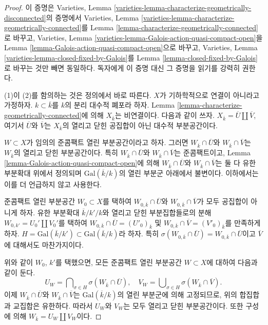 \begin{proof}
이 증명은 Varieties, Lemma
\ref{varieties-lemma-characterize-geometrically-disconnected}의 증명에서
Varieties, Lemma
\ref{varieties-lemma-characterize-geometrically-connected}를 Lemma
\ref{lemma-characterize-geometrically-connected}로 바꾸고, Varieties, Lemma
\ref{varieties-lemma-Galois-action-quasi-compact-open}을 Lemma
\ref{lemma-Galois-action-quasi-compact-open}으로 바꾸고, Varieties, Lemma
\ref{varieties-lemma-closed-fixed-by-Galois}를 Lemma
\ref{lemma-closed-fixed-by-Galois}로 바꾸는 것만 빼면 동일하다.
독자에게 이 증명 대신 그 증명을 읽기를 강력히 권한다.

\medskip\noindent
(1)이 (2)를 함의하는 것은 정의에서 바로 따른다.
$X$가 기하학적으로 연결이 아니라고 가정하자.
$k \subset \overline{k}$를 $k$의 분리 대수적 폐포라 하자. Lemma
\ref{lemma-characterize-geometrically-connected}에 의해
$X_{\overline{k}}$는 비연결이다. 다음과 같이 쓰자.
$X_{\overline{k}} = \overline{U} \amalg \overline{V}$,
여기서 $\overline{U}$와 $\overline{V}$는 $X_{\overline{k}}$의 열리고 닫힌
공집합이 아닌 대수적 부분공간이다.

\medskip\noindent
$W \subset X$가 임의의 준콤팩트 열린 부분공간이라고 하자.
그러면 $W_{\overline{k}} \cap \overline{U}$와
$W_{\overline{k}} \cap \overline{V}$는 $W_{\overline{k}}$의 열리고 닫힌
부분공간이다. 특히 $W_{\overline{k}} \cap \overline{U}$와
$W_{\overline{k}} \cap \overline{V}$는 준콤팩트이고, Lemma
\ref{lemma-Galois-action-quasi-compact-open}에 의해
$W_{\overline{k}} \cap \overline{U}$와
$W_{\overline{k}} \cap \overline{V}$는 둘 다 유한 부분확대 위에서
정의되며 $\text{Gal}(\overline{k}/k)$의 열린 부분군 아래에서 불변이다.
이하에서는 이를 더 언급하지 않고 사용한다.

\medskip\noindent
준콤팩트 열린 부분공간 $W_0 \subset X$를 택하여
$W_{0, \overline{k}} \cap \overline{U}$와
$W_{0, \overline{k}} \cap \overline{V}$가 모두 공집합이 아니게 하자.
유한 부분확대 $\overline{k}/k'/k$와 열리고 닫힌 부분집합들로의 분해
$W_{0, k'} = U_0' \amalg V_0'$를 택하여
$W_{0, \overline{k}} \cap \overline{U} = (U'_0)_{\overline{k}}$ 및
$W_{0, \overline{k}} \cap \overline{V} = (V'_0)_{\overline{k}}$를
만족하게 하자.
$H = \text{Gal}(\overline{k}/k') \subset \text{Gal}(\overline{k}/k)$라 하자.
특히
$\sigma(W_{0, \overline{k}} \cap \overline{U}) =
W_{0, \overline{k}} \cap \overline{U}$이고 $\overline{V}$에 대해서도
마찬가지이다.

\medskip\noindent
위와 같이 $W_0$, $k'$를 택했으면, 모든 준콤팩트 열린 부분공간
$W \subset X$에 대하여 다음과 같이 둔다.
$$
U_W =
\bigcap\nolimits_{\sigma \in H} \sigma(W_{\overline{k}} \cap \overline{U}),
\quad
V_W =
\bigcup\nolimits_{\sigma \in H} \sigma(W_{\overline{k}} \cap \overline{V}).
$$
이제 $W_{\overline{k}} \cap \overline{U}$와
$W_{\overline{k}} \cap \overline{V}$는 $\text{Gal}(\overline{k}/k)$의 열린
부분군에 의해 고정되므로, 위의 합집합과 교집합은 유한하다. 따라서
$U_W$와 $V_W$는 모두 열리고 닫힌 부분공간이다. 또한 구성에 의해
$W_{\bar k} = U_W \amalg V_W$이다.


\end{proof}
